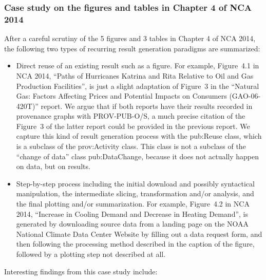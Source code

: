 \subsubsection{Case study on the figures and tables in Chapter 4 of NCA 2014}
\label{sec:case}
After a careful scrutiny of the 5 figures and 3 tables in Chapter 4 of NCA 2014, the following two types of recurring result generation paradigms are summarized:
\begin{itemize}
	\item Direct reuse of an existing result such as a figure. For example, Figure~4.1 in NCA 2014, ``Paths of Hurricanes Katrina and Rita Relative to Oil and Gas Production Facilities'', is just a slight adaptation of Figure~3 in the ``Natural Gas: Factors Affecting Prices and Potential Impacts on Consumers (GAO-06-420T)'' report. We argue that if both reports have their results recorded in provenance graphs with PROV-PUB-O/S, a much precise citation of the Figure~3 of the latter report could be provided in the previous report. We capture this kind of result generation process with the pub:Reuse class, which is a subclass of the prov:Activity class. This class is not a subclass of the ``change of data'' class pub:DataChange, because it does not actually happen on data, but on results.
	\item Step-by-step process including the initial download and possibly syntactical manipulation, the intermediate slicing, transformation and/or analysis, and the final plotting and/or summarization. For example, Figure~4.2 in NCA 2014, ``Increase in Cooling Demand and Decrease in Heating Demand'', is generated by downloading source data from a landing page on the NOAA National Climate Data Center Website by filling out a data request form, and then following the processing method described in the caption of the figure, followed by a plotting step not described at all.
\end{itemize}
Interesting findings from this case study include:
